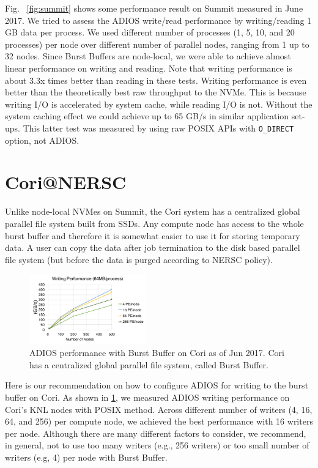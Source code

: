 Fig. ~\ref{fig:summit} shows some performance result on Summit measured in June 2017. We tried to assess the ADIOS write/read performance by writing/reading 1 GB data per process. We used different number of processes (1, 5, 10, and 20 processes) per node over different number of parallel nodes, ranging from 1 up to 32 nodes. Since Burst Buffers are node-local, we were able to achieve almost linear performance on writing and reading.  Note that writing performance is about 3.3x times better than reading in these tests. Writing performance is even better than the theoretically best raw throughput to the NVMe. This is because writing I/O is accelerated by system cache, while reading I/O is not. Without the system caching effect we could achieve up to 65 GB/s in similar application set-ups. This latter test was measured by using raw POSIX APIs with \verb+O_DIRECT+ option, not ADIOS.

\section{Cori@NERSC}

Unlike node-local NVMes on Summit, the Cori system has a centralized global parallel file system built from SSDs. Any compute node has access to the whole burst buffer and therefore it is somewhat easier to use it for storing temporary data. A user can copy the data after job termination to the disk based parallel file system (but before the data is purged according to NERSC policy).

\begin{figure}
\center
\includegraphics[width=0.45\textwidth]{figures/Adios_write_on_Cori.pdf}
\caption{ADIOS performance with Burst Buffer on Cori as of Jun 2017. Cori has a centralized global parallel file system, called Burst Buffer.}
\label{fig:cori}
\end{figure}

Here is our recommendation on how to configure ADIOS for writing to the burst buffer on Cori.
As shown in \ref{fig:cori}, we measured ADIOS writing performance on Cori's KNL nodes with POSIX method. Across different number of writers (4, 16, 64, and 256) per compute node, we achieved the best performance with 16 writers per node. Although there are many different factors to consider, we recommend, in general, not to use too many writers (e.g., 256 writers) or too small number of writers (e.g, 4) per node with Burst Buffer.

